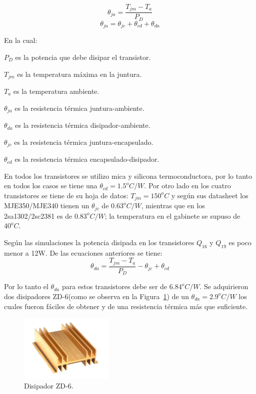 $$
   \theta_{ja}=\dfrac{T_{jm}-T_a}{P_D}
$$
$$
	\theta_{ja}=\theta_{jc}+\theta_{cd}+\theta_{da}
$$

En la cual:
\begin{list}{ }
\item $P_D$  es la potencia que debe disipar el transistor.
\item $T_{jm}$ es la temperatura máxima en la juntura.
\item  $T_a$ es la temperatura ambiente.
\item  $\theta_{ja}$ es la resistencia térmica juntura-ambiente.
\item  $\theta_{da}$ es la resistencia térmica disipador-ambiente.
\item  $\theta_{jc}$ es la resistencia térmica juntura-encapsulado.
\item  $\theta_{cd}$ es la resistencia térmica encapsulado-disipador.
\end{list}
En todos los transistores se utilizo mica y silicona termoconductora, por lo tanto en todos los casos se tiene una $\theta_{cd}=1.5^oC/W$.
Por otro lado en los cuatro transistores se tiene de su hoja de datos: $T_{jm}=150^oC$ y según sus datasheet los MJE350/MJE340 tienen un $\theta_{jc}$ de $0.63^oC/W$, mientras que en los 2sa1302/2sc2381 es de $0.83^oC/W$; la temperatura en el gabinete se supuso de $40^oC$.

Según las simulaciones la potencia disipada en los transistores $Q_{16}$ y $Q_{19}$ es poco menor a 12W. De las ecuaciones anteriores se tiene:
$$
	\theta_{da}=\dfrac{T_{jm}-T_a}{P_D} - \theta_{jc}+\theta_{cd}
$$

Por lo tanto el $\theta_{da}$ para estos transistores debe ser de $6.84^oC/W$. Se adquirieron dos disipadores ZD-6(como se observa en la Figura~\ref{zd6}) de un  $\theta_{da}=2.9^oC/W$ los cuales fueron fáciles de obtener y de una resistencia térmica más que suficiente.

\begin{figure}[H]
\centerline{
\includegraphics[width=0.4\textwidth]{img/zd-6.jpg}}
\caption{Disipador ZD-6.}
\label{zd6} 
\end{figure}

